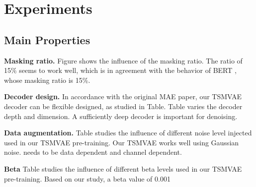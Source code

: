 \documentclass[12pt]{article} %
\begin{document}
\section{Experiments}

\subsection{Main Properties}

\textbf{Masking ratio.} Figure shows the influence of the masking ratio. The ratio of 15\% seems to work well, which is in agreement with the behavior of BERT \citep{devlin2019bert}, whose masking ratio is 15\%. 

\textbf{Decoder design.} In accordance with the original MAE paper, our TSMVAE decoder can be flexible designed, as studied in Table. Table varies the decoder depth and dimension. A sufficiently deep decoder is important for denoising.

\textbf{Data augmentation.} Table studies the influence of different noise level injected used in our TSMVAE pre-training. Our TSMVAE works well using Gaussian noise.  needs to be data dependent and channel dependent.

\textbf{Beta} Table studies the influence of different beta levels used in our TSMVAE pre-training. Based on our study, a beta value of 0.001 
\end{document}

